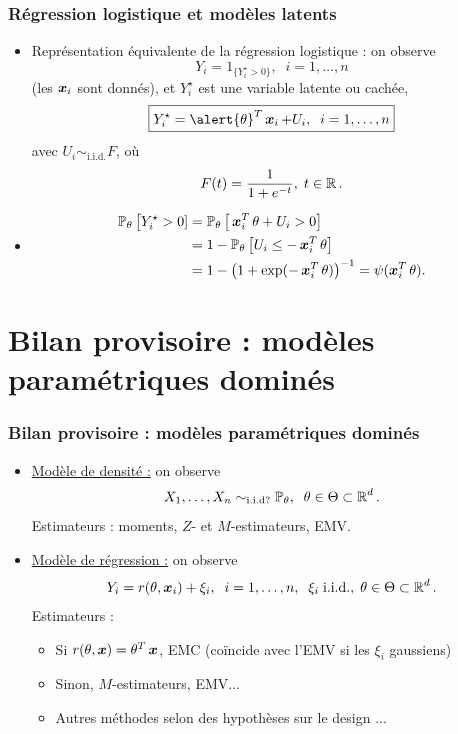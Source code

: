 \begin{frame}
\frametitle{Régression logistique et modèles latents}
\begin{itemize}
\item \alert{Représentation équivalente de la régression logistique} : on observe
$$\boxed{Y_i = 1_{\big\{Y_i^\star >0\big\}},\;\;i=1,\ldots,n}$$
(les $\operatorname{\boldsymbol{x}}_i$ sont donnés), et $Y_i^\star$ est une  \alert{variable latente} ou cachée,
$$\boxed{Y^\star_i =\alert{\truetheta}^T \bx_i + U_i,\;\;i=1,\ldots, n}$$
avec \alert{$U_i\sim_{\text{i.i.d.}} F$}, où
$$F(t) = \frac{1}{1+e^{-t}},\;t \in \operatorname{{\mathbb R}}.$$
\item
\begin{align*}
\operatorname{{\mathbb P}}_\theta\big[Y_i^\star>0] & = \operatorname{{\mathbb P}}_\theta\big[\operatorname{\boldsymbol{x}}_i^T\theta + U_i >0\big] \\
& = 1-\operatorname{{\mathbb P}}_\theta\big[U_i \leq -\operatorname{\boldsymbol{x}}_i^T\theta\big] \\
& = 1-\big(1+\exp(-\operatorname{\boldsymbol{x}}_i^T\theta)\big)^{-1} =  \psi(\operatorname{\boldsymbol{x}}_i^T\theta).
\end{align*}
\end{itemize}
\end{frame}

\section{Bilan provisoire : modèles paramétriques dominés}

\begin{frame}
\frametitle{Bilan provisoire : modèles paramétriques dominés}
\begin{itemize}
\item \underline{\alert{Modèle de densité :}} on observe
$$X_1,\ldots,X_n \sim_{\text{i.i.d?}} \operatorname{{\mathbb P}}_\theta,\;\;\theta \in \Theta \subset \operatorname{{\mathbb R}}^d.$$
{\color{blue}Estimateurs :} moments, $Z$- et $M$-estimateurs, \alert{EMV}.
\item\underline{\alert{Modèle de régression :}} on observe
$$Y_i = r(\theta, \operatorname{\boldsymbol{x}}_i)+\xi_i,\;\;i=1,\ldots, n,\;\;\xi_i\;\text{i.i.d.},\;\theta \in \Theta \subset \operatorname{{\mathbb R}}^d.$$
{\color{blue} Estimateurs :}
\begin{itemize}
\item Si $r(\theta, \operatorname{\boldsymbol{x}}) =  \theta^T\operatorname{\boldsymbol{x}}$, EMC (coïncide avec l'\alert{EMV} si les $\xi_i$ gaussiens)
\item Sinon, $M$-estimateurs, \alert{EMV}...
\item Autres méthodes selon des \alert{hypothèses} sur le \og design \fg{}...
\end{itemize}
\end{itemize}
\end{frame}


